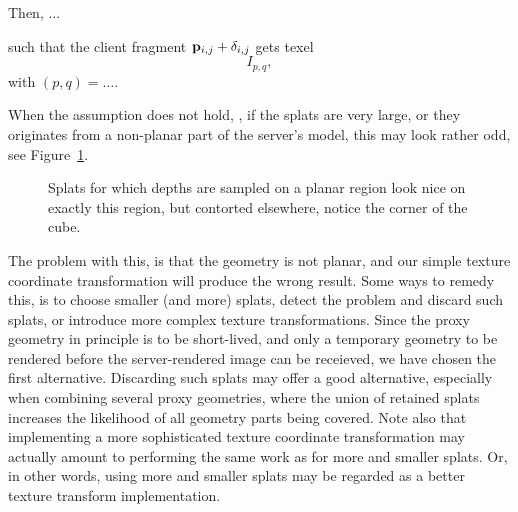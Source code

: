 Then, ...

such that the client fragment $\mathbf{p}_{i, j} + \delta_{i, j}$ gets texel
\[
  I_{p, q},
\]
with $(p, q) = \ldots$.

When the assumption does not hold, \eg, if the splats are very large, or they
originates from a non-planar part of the server's model, this may look rather
odd, see Figure~\ref{fig:LargeSplatsOnCorners}.

\begin{figure}[htb]
  \centering
  \caption{\label{fig:LargeSplatsOnCorners}
           Splats for which depths are sampled on a planar region look nice on
  exactly this region, but contorted elsewhere, notice the corner of the cube.}
\end{figure}

The problem with this, is that the geometry is not planar, and our simple texture
coordinate transformation will produce the wrong result. Some ways to remedy
this, is to choose smaller (and more) splats, detect the problem and discard
such splats, or introduce more complex texture transformations. Since the proxy
geometry in principle is to be short-lived, and only a temporary geometry to be
rendered before the server-rendered image can be receieved, we have chosen the
first alternative. Discarding such splats may offer a good alternative,
especially when combining several proxy geometries, where the union of retained
splats increases the likelihood of all geometry parts being covered. Note also
that implementing a more sophisticated texture coordinate transformation may
actually amount to performing the same work as for more and smaller splats. Or,
in other words, using more and smaller splats may be regarded as a better
texture transform implementation.


